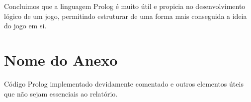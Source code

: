 \documentclass[a4paper]{article}
\begin{document}
Concluimos que a linguagem Prolog é muito útil e propicia no desenvolvimento lógico de um jogo, permitindo estruturar de uma forma mais conseguida a ideia do jogo em si.

\clearpage
{}
\renewcommand\refname{Bibliografia}



\newpage
\appendix
\section{Nome do Anexo}
Código Prolog implementado devidamente comentado e outros elementos úteis que não sejam essenciais ao relatório.
\end{document}
